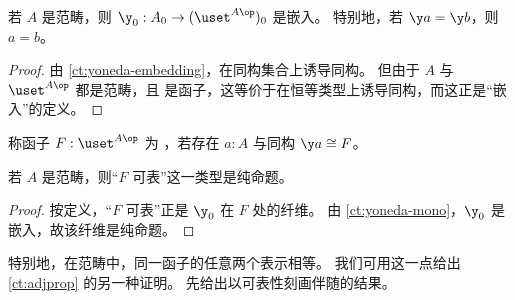 \begin{cor}\label{ct:yoneda-mono}
  若 $A$ 是范畴，则 $\y_0 : A_0 \to (\uset^{A\op})_0$ 是嵌入。
  特别地，若 $\y a = \y b$，则 $a=b$。
\end{cor}
\begin{proof}
  由 \cref{ct:yoneda-embedding}，\y 在同构集合上诱导同构。
  但由于 $A$ 与 $\uset^{A\op}$ 都是范畴，且 \y 是函子，这等价于在恒等类型上诱导同构，而这正是“嵌入”的定义。
\end{proof}

\begin{defn}\label{ct:representable}
  称函子 $F:\uset^{A\op}$ 为
  ，若存在 $a:A$ 与同构 $\y a \cong F$。
\end{defn}

\begin{thm}\label{ct:representable-prop}
  若 $A$ 是范畴，则“$F$ 可表”这一类型是纯命题。
\end{thm}
\begin{proof}
  按定义，“$F$ 可表”正是 $\y_0$ 在 $F$ 处的纤维。
  由 \cref{ct:yoneda-mono}，$\y_0$ 是嵌入，故该纤维是纯命题。
\end{proof}

特别地，在范畴中，同一函子的任意两个表示相等。
我们可用这一点给出 \cref{ct:adjprop} 的另一种证明。
先给出以可表性刻画伴随的结果。

